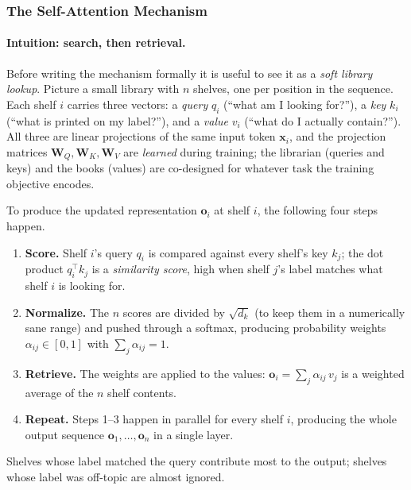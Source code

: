 \documentclass[11pt,a4paper]{report}
\newcommand{\x}{\bm{x}}
\newcommand{\W}{\bm{W}}
\begin{document}
\subsubsection{The Self-Attention Mechanism}
\label{sec:self_attention}

\paragraph{Intuition: search, then retrieval.}  Before writing the mechanism formally it is useful to see it as a \emph{soft library lookup}.  Picture a small library with $n$ shelves, one per position in the sequence.  Each shelf $i$ carries three vectors: a \emph{query} $q_i$ (``what am I looking for?''), a \emph{key} $k_i$ (``what is printed on my label?''), and a \emph{value} $v_i$ (``what do I actually contain?'').  All three are linear projections of the same input token $\x_i$, and the projection matrices $\W_Q,\W_K,\W_V$ are \emph{learned} during training; the librarian (queries and keys) and the books (values) are co-designed for whatever task the training objective encodes.

To produce the updated representation $\bm{o}_i$ at shelf $i$, the following four steps happen.
\begin{enumerate}[itemsep=2pt]
\item \textbf{Score.} Shelf $i$'s query $q_i$ is compared against every shelf's key $k_j$; the dot product $q_i^{\!\top} k_j$ is a \emph{similarity score}, high when shelf $j$'s label matches what shelf $i$ is looking for.
\item \textbf{Normalize.} The $n$ scores are divided by $\sqrt{d_k}$ (to keep them in a numerically sane range) and pushed through a softmax, producing probability weights $\alpha_{ij}\in[0,1]$ with $\sum_j \alpha_{ij}=1$.
\item \textbf{Retrieve.} The weights are applied to the values: $\bm{o}_i = \sum_j \alpha_{ij}\, v_j$ is a weighted average of the $n$ shelf contents.
\item \textbf{Repeat.} Steps 1--3 happen in parallel for every shelf $i$, producing the whole output sequence $\bm{o}_1,\dots,\bm{o}_n$ in a single layer.
\end{enumerate}
Shelves whose label matched the query contribute most to the output; shelves whose label was off-topic are almost ignored.
\end{document}
